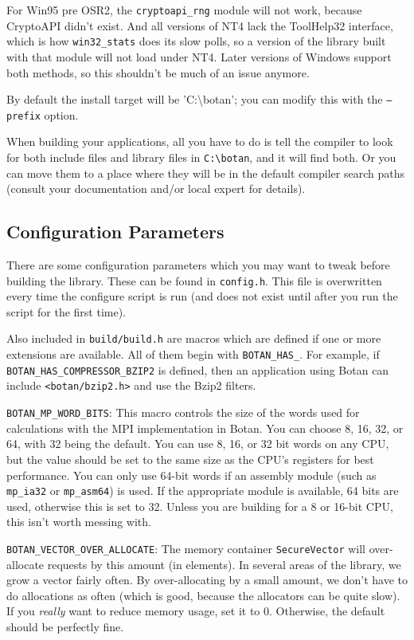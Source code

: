 \documentclass{article}
\newcommand{\filename}[1]{\texttt{#1}}
\newcommand{\module}[1]{\texttt{#1}}
\newcommand{\type}[1]{\texttt{#1}}
\newcommand{\macro}[1]{\texttt{#1}}
\begin{document}
For Win95 pre OSR2, the \verb|cryptoapi_rng| module will not work,
because CryptoAPI didn't exist. And all versions of NT4 lack the
ToolHelp32 interface, which is how \verb|win32_stats| does its slow
polls, so a version of the library built with that module will not
load under NT4. Later versions of Windows support both methods, so
this shouldn't be much of an issue anymore.

By default the install target will be 'C:\textbackslash botan'; you
can modify this with the \texttt{--prefix} option.

When building your applications, all you have to do is tell the
compiler to look for both include files and library files in
\verb|C:\botan|, and it will find both. Or you can move them to a
place where they will be in the default compiler search paths (consult
your documentation and/or local expert for details).

\subsection{Configuration Parameters}

There are some configuration parameters which you may want to tweak
before building the library. These can be found in
\filename{config.h}. This file is overwritten every time the configure
script is run (and does not exist until after you run the script for
the first time).

Also included in \filename{build/build.h} are macros which are defined
if one or more extensions are available. All of them begin with
\verb|BOTAN_HAS_|. For example, if \verb|BOTAN_HAS_COMPRESSOR_BZIP2|
is defined, then an application using Botan can include
\filename{<botan/bzip2.h>} and use the Bzip2 filters.

\macro{BOTAN\_MP\_WORD\_BITS}: This macro controls the size of the
words used for calculations with the MPI implementation in Botan. You
can choose 8, 16, 32, or 64, with 32 being the default. You can use 8,
16, or 32 bit words on any CPU, but the value should be set to the
same size as the CPU's registers for best performance. You can only
use 64-bit words if an assembly module (such as \module{mp\_ia32} or
\module{mp\_asm64}) is used. If the appropriate module is available,
64 bits are used, otherwise this is set to 32. Unless you are building
for a 8 or 16-bit CPU, this isn't worth messing with.

\macro{BOTAN\_VECTOR\_OVER\_ALLOCATE}: The memory container
\type{SecureVector} will over-allocate requests by this amount (in
elements). In several areas of the library, we grow a vector fairly often. By
over-allocating by a small amount, we don't have to do allocations as often
(which is good, because the allocators can be quite slow). If you \emph{really}
want to reduce memory usage, set it to 0. Otherwise, the default should be
perfectly fine.
\end{document}
